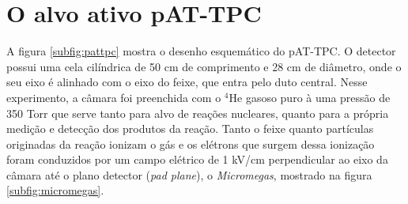 \documentclass[a4paper,12pt,oneside]{book}
\begin{document}
\section{O alvo ativo pAT-TPC}

\par A figura \ref{subfig:pattpc} mostra o desenho esquemático do pAT-TPC. O detector possui uma cela cilíndrica de 50 cm de comprimento e 28 cm de diâmetro, onde o seu eixo é alinhado com o eixo do feixe\cite{pattpc}, que entra pelo duto central. Nesse experimento, a câmara foi preenchida com o $^4$He gasoso puro à uma pressão de 350 Torr que serve tanto para alvo de reações nucleares, quanto para a própria medição e detecção dos produtos da reação\cite{pattpc, pattpc2}. Tanto o feixe quanto partículas originadas da reação ionizam o gás e os elétrons que surgem dessa ionização foram conduzidos por um campo elétrico de 1 kV/cm perpendicular ao eixo da câmara até o plano detector (\textit{pad plane}), o \textit{Micromegas}\cite{micromegas}, mostrado na figura \ref{subfig:micromegas}.
\end{document}
